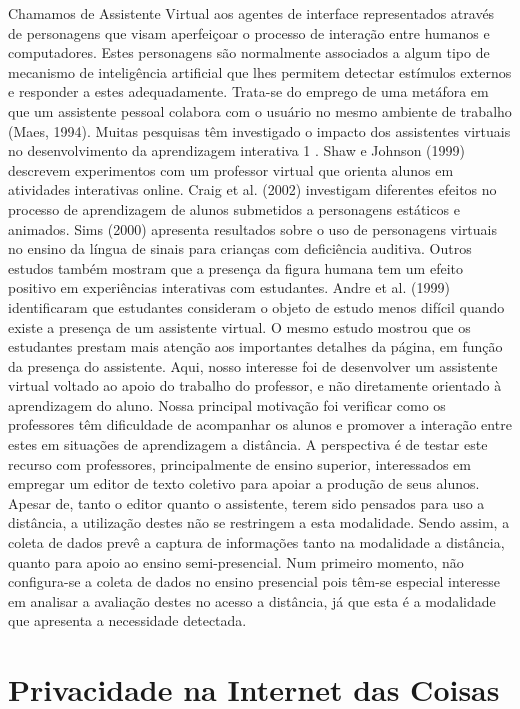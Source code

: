 Chamamos de Assistente Virtual aos agentes de interface representados através de personagens que visam aperfeiçoar o processo de interação entre humanos e computadores. Estes personagens são normalmente associados a algum tipo de mecanismo de inteligência artificial que lhes permitem detectar estímulos externos e responder a estes adequadamente. Trata-se do emprego de uma metáfora em que um assistente pessoal colabora com o usuário no mesmo ambiente de trabalho (Maes, 1994). Muitas pesquisas têm investigado o impacto dos assistentes virtuais no desenvolvimento da aprendizagem interativa 1 . Shaw e Johnson (1999) descrevem experimentos com um professor virtual que orienta alunos em atividades interativas online. Craig et al. (2002) investigam diferentes efeitos no processo de aprendizagem de alunos submetidos a personagens estáticos e animados. Sims (2000) apresenta resultados sobre o uso de personagens virtuais no ensino da língua de sinais para crianças com deficiência auditiva. Outros estudos também mostram que a presença da figura humana tem um efeito positivo em experiências interativas com estudantes. Andre et al. (1999) identificaram que estudantes consideram o objeto de estudo menos difícil quando existe a presença de um assistente virtual. O mesmo estudo mostrou que os estudantes prestam mais atenção aos importantes detalhes da página, em função da presença do assistente. Aqui, nosso interesse foi de desenvolver um assistente virtual voltado ao apoio do trabalho do professor, e não diretamente orientado à aprendizagem do aluno. Nossa principal motivação foi verificar como os professores têm dificuldade de acompanhar os alunos e promover a interação entre estes em situações de aprendizagem a distância. A perspectiva é de testar este recurso com professores, principalmente de ensino superior, interessados em empregar um editor de texto coletivo para apoiar a produção de seus alunos. Apesar de, tanto o editor quanto o assistente, terem sido pensados para uso a distância, a utilização destes não se restringem a esta modalidade. Sendo assim, a coleta de dados prevê a captura de informações tanto na modalidade a distância, quanto para apoio ao ensino semi-presencial. Num primeiro momento, não configura-se a coleta de dados no ensino presencial pois têm-se especial interesse em analisar a avaliação destes no acesso a distância, já que esta é a modalidade que apresenta a necessidade detectada.

\section{Privacidade na Internet das Coisas} \label{s:privacidade_na_internet_das_coisas}


